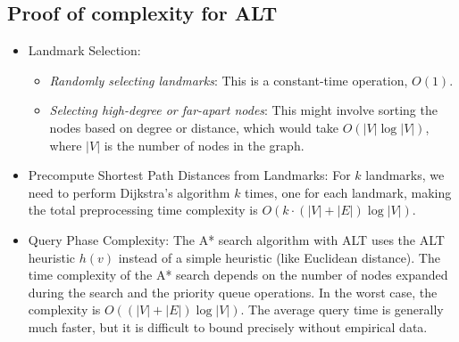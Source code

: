 \begin{appendices}
\section{Proof of complexity for ALT}\label{appendix:ALT:complexity}
	\begin{itemize}
		\item Landmark Selection:
			\begin{itemize}
				\item \textit{Randomly selecting landmarks}: This is a constant-time operation, $ O(1) $.
				\item \textit{Selecting high-degree or far-apart nodes}: This might involve sorting the nodes based on degree or distance, which would take $ O(|V| \log |V|) $, where $ |V| $ is the number of nodes in the graph.
			\end{itemize}
		\item Precompute Shortest Path Distances from Landmarks: For $k$ landmarks, we need to perform Dijkstra’s algorithm $k$ times, one for each landmark, making the total preprocessing time complexity is $O(k \cdot (|V| + |E|) \log |V|)$.
		\item Query Phase Complexity: The A* search algorithm with ALT uses the ALT heuristic $ h(v) $ instead of a simple heuristic (like Euclidean distance). The time complexity of the A* search depends on the number of nodes expanded during the search and the priority queue operations. In the worst case, the complexity is $ O((|V| + |E|) \log |V|) $. The average query time is generally much faster, but it is difficult to bound precisely without empirical data.		
	\end{itemize}


\end{appendices}
